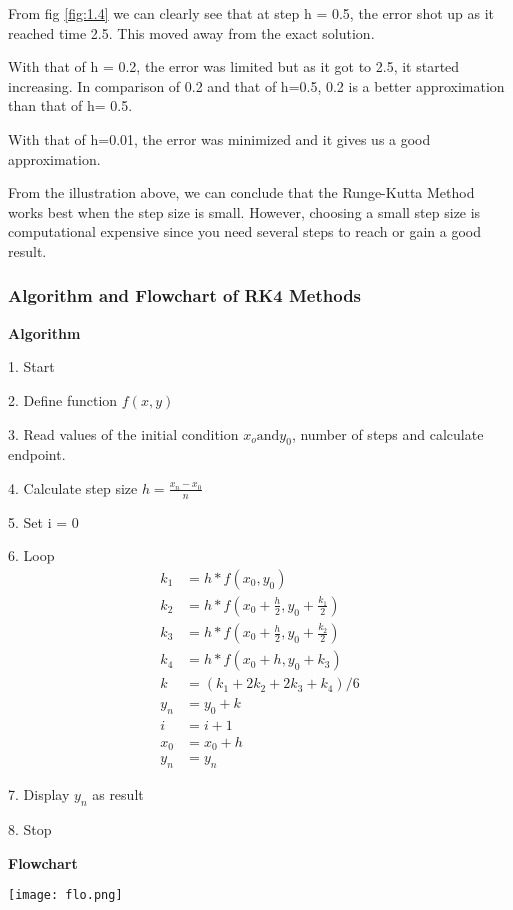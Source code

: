 \documentclass[12pt,a4paper]{article}
\begin{document}
\newpage
\noindent
From fig \ref{fig:1.4} we can clearly see that at step h = 0.5, the error shot up as it reached time 2.5. This moved away from the exact solution.

With that of h = 0.2, the error was limited but as it got to 2.5, it started increasing. In comparison of 0.2 and that of h=0.5, 0.2 is a better approximation than that of h= 0.5.

With that of h=0.01, the error was minimized and it gives us a good approximation. 

From the illustration above, we can conclude that the Runge-Kutta Method works best when the step size is small. However, choosing a small step size is computational expensive since you need several steps to reach or gain a good result.

\subsubsection{Algorithm and Flowchart of RK4 Methods}

\textbf{Algorithm}

1. Start

2. Define function $f(x,y)$

3. Read values of the initial condition $x_o \text{and} y_0$, number of steps and calculate endpoint.

4. Calculate step size $h = \frac{x_n - x_0}{n}$

5. Set i = 0

6. Loop
\begin{align*}
k_1 &= h * f(x_0 , y_0) \\
k_2 &= h * f(x_0 + \frac{h}{2}, y_0 + \frac{k_1}{2}) \\
k_3 &= h * f(x_0 + \frac{h}{2}, y_0 + \frac{k_2}{2}) \\
k_4 &= h * f(x_0 + h, y_0 + k_3) \\
k &= (k_1 + 2k_2 + 2k_3 + k_4)/6 \\
y_n &= y_0 + k \\
i &= i+1 \\
x_0 &= x_0 + h \\
y_n &= y_n
\end{align*}

7. Display $y_n$ as result

8. Stop

\newpage
\textbf{Flowchart}

\begin{center}
\texttt{[image: flo.png]}
\end{center}
\end{document}
